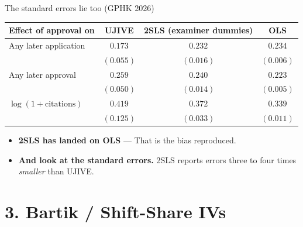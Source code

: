 \documentclass[
  11pt,
  ignorenonframetext,
  aspectratio=169,
]{beamer}
\providecommand{\tightlist}{%
  \setlength{\itemsep}{0pt}\setlength{\parskip}{0pt}}
\begin{document}
\begin{frame}{The standard errors lie too (GPHK 2026)}
\protect{}\label{the-standard-errors-lie-too-gphk-2026}
\begin{center}\small
\begin{tabular}{lccc}
\toprule
Effect of approval on & UJIVE & 2SLS (examiner dummies) & OLS \\
\midrule
Any later application & $0.173$ & $0.232$ & $0.234$ \\
                      & $(0.055)$ & $(0.016)$ & $(0.006)$ \\
Any later approval    & $0.259$ & $0.240$ & $0.223$ \\
                      & $(0.050)$ & $(0.014)$ & $(0.005)$ \\
$\log(1+\text{citations})$ & $0.419$ & $0.372$ & $0.339$ \\
                      & $(0.125)$ & $(0.033)$ & $(0.011)$ \\
\bottomrule
\end{tabular}
\end{center}

\begin{itemize}
\tightlist
\item
  \textbf{2SLS has landed on OLS} --- That is the bias reproduced.
\item
  \textbf{And look at the standard errors.} 2SLS reports errors three to
  four times \emph{smaller} than UJIVE.
\end{itemize}
\end{frame}

\section{3. Bartik / Shift-Share IVs}\label{bartik-shift-share-ivs}
\end{document}
